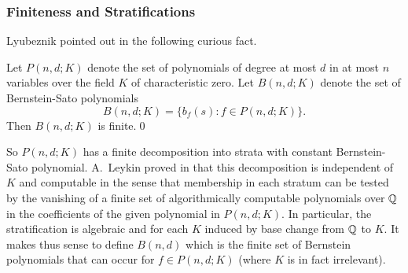\subsubsection{Finiteness and Stratifications}
Lyubeznik pointed out in \cite{DM:L-Bpoly} the following curious
fact. 
\begin{theorem}
Let $P(n,d;K)$ denote the set of polynomials of degree at most $d$ in
at most $n$ variables over the field $K$ of characteristic zero. Let
$B(n,d;K)$ denote the set  of Bernstein-Sato polynomials
\[
B(n,d;K)=\{b_f(s):f\in P(n,d;K)\}.
\]
Then $B(n,d;K)$ is finite.\qed
\end{theorem}
So $P(n,d;K)$ has a finite decomposition into strata with constant
Bernstein-Sato polynomial.
A.\ Leykin proved in \cite{DM:Ley} that this decomposition is independent
of $K$ and computable
in the sense that membership in  each stratum can be tested by the
vanishing of a
finite set of algorithmically computable polynomials over ${\mathbb Q}$ in the
coefficients of the given polynomial in $P(n,d;K)$. In particular,
the stratification is algebraic and for each $K$ induced by base
change from ${\mathbb Q}$ to $K$. It makes thus sense to define $B(n,d)$ which
is the finite set of Bernstein polynomials that can occur for $f\in
P(n,d;K)$ (where $K$ is in fact irrelevant).
